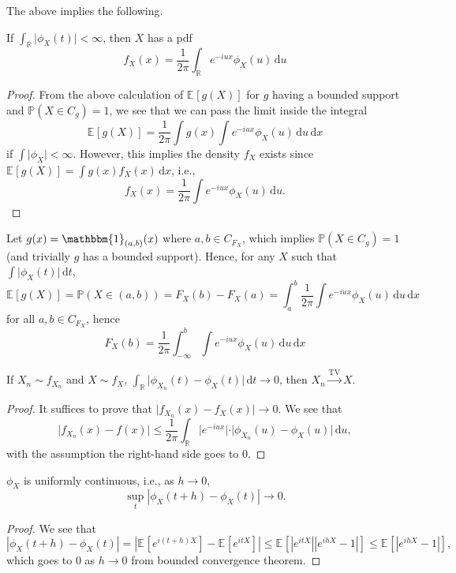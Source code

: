 The above implies the following.

\begin{theorem}\label{thm:pdf-characteristic-function}
	If \(\int _\mathbb{R} \vert \phi _X(t) \vert < \infty \), then \(X\) has a pdf
	\[
		f_X(x) = \frac{1}{2\pi } \int _\mathbb{R} e^{-iux} \phi _X(u) \,\mathrm{d} u
	\]
\end{theorem}
\begin{proof}
	From the above calculation of \(\mathbb{E}_{}[g(X)] \) for \(g\) having a bounded support and \(\mathbb{P} (X \in C_g) = 1\), we see that we can pass the limit inside the integral
	\[
		\mathbb{E}_{}[g(X)]
		= \frac{1}{2\pi } \int g(x) \int e^{-iux} \phi _X(u) \,\mathrm{d} u \,\mathrm{d} x
	\]
	if \(\int \vert \phi _X \vert < \infty \). However, this implies the density \(f_X\) exists since \(\mathbb{E}_{}[g(X)]
	= \int g(x) f_X(x) \,\mathrm{d} x\), i.e.,
	\[
		f_X(x) = \frac{1}{2\pi } \int e^{-iux} \phi _X(u) \,\mathrm{d} u .
	\]
\end{proof}

\begin{eg}
	Let \(g(x) = \mathbbm{1}_{(a, b)} (x) \) where \(a, b \in C_{F_X}\), which implies \(\mathbb{P} (X \in C_g) = 1\) (and trivially \(g\) has a bounded support). Hence, for any \(X\) such that \(\int \vert \phi _X(t) \vert \,\mathrm{d} t\),
	\[
		\mathbb{E}_{}[g(X)]
		= \mathbb{P} (X \in (a, b))
		= F_X(b) - F_X(a)
		= \int_{a}^{b} \frac{1}{2\pi } \int e^{-iux} \phi _X(u) \,\mathrm{d}u \,\mathrm{d} x
	\]
	for all \(a, b\in C_{F_X}\), hence
	\[
		F_X(b)
		= \frac{1}{2\pi } \int_{-\infty }^{b} \int e^{-iux} \phi _X(u) \,\mathrm{d}u \,\mathrm{d} x
	\]
\end{eg}

\begin{corollary}
	If \(X_n \sim f_{X_n}\) and \(X \sim f_X\), \(\int _\mathbb{R} \vert \phi _{X_n}(t) - \phi _X (t) \vert \,\mathrm{d} t \to 0\), then \(X_n \overset{\operatorname{TV} }{\to } X\).
\end{corollary}
\begin{proof}
	It suffices to prove that \(\vert f_{X_n}(x) - f_X(x) \vert \to 0\). We see that
	\[
		\vert f_{X_n}(x) - f(x) \vert
		\leq \frac{1}{2\pi } \int _{\mathbb{R} } \vert e^{-iux} \vert \cdot \vert \phi _{X_n}(u) - \phi _X(u) \vert \,\mathrm{d} u,
	\]
	with the assumption the right-hand side goes to \(0\).
\end{proof}



\begin{proposition}
	\(\phi _X\) is uniformly continuous, i.e., as \(h \to 0\),
	\[
		\sup _t \left\vert \phi _X(t + h) - \phi _X(t) \right\vert \to 0.
	\]
\end{proposition}
\begin{proof}
	We see that
	\[
		\left\vert \phi _{X}(t + h) - \phi _X(t) \right\vert
		= \left\vert \mathbb{E}_{}[e^{i(t + h)X}] - \mathbb{E}_{}[e^{itX}] \right\vert
		\leq \mathbb{E}_{}\left[ \left\vert e^{itX} \right\vert \left\vert e^{ihX} - 1 \right\vert \right]
		\leq \mathbb{E}_{}\left[ \left\vert e^{ihX} - 1 \right\vert \right],
	\]
	which goes to \(0\) as \(h \to 0\) from bounded convergence theorem.
\end{proof}

